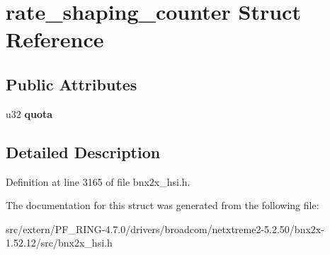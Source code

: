 \hypertarget{structrate__shaping__counter}{
\section{rate\_\-shaping\_\-counter Struct Reference}
\label{structrate__shaping__counter}
}
\subsection*{Public Attributes}
\begin{DoxyCompactItemize}
\item 
\hypertarget{structrate__shaping__counter_a0a58358460d2f687aa00d693c9a83e9a}{
u32 {\bfseries quota}}
\label{structrate__shaping__counter_a0a58358460d2f687aa00d693c9a83e9a}

\end{DoxyCompactItemize}


\subsection{Detailed Description}


Definition at line 3165 of file bnx2x\_\-hsi.h.



The documentation for this struct was generated from the following file:\begin{DoxyCompactItemize}
\item 
src/extern/PF\_\-RING-\/4.7.0/drivers/broadcom/netxtreme2-\/5.2.50/bnx2x-\/1.52.12/src/bnx2x\_\-hsi.h\end{DoxyCompactItemize}
